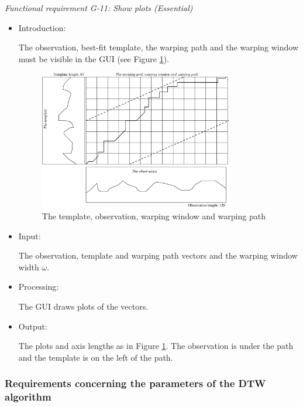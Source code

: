 \documentclass[a4paper,11pt]{article}
\begin{document}
\noindent \emph{Functional requirement G-11: Show plots (Essential)}
\begin{itemize}
\item Introduction:

The observation, best-fit template, the warping path and the warping window must be visible in the GUI 
(see Figure \ref{fig:teobgrid}).
\begin{figure} 
\begin{center} 
\includegraphics[width=0.8\textwidth]{srs_teobgrid.eps}
\caption{The template, observation, warping window and warping path} 
\label{fig:teobgrid}
\end{center} 
\end{figure}

\item Input:

The observation, template and warping path vectors and the warping window width $\omega$.
\item Processing:

The GUI draws plots of the vectors.
\item Output:

The plots and axis lengths as in Figure \ref{fig:teobgrid}. The observation is under the path and the template is on the left of
the path.
\end{itemize}

\subsubsection{Requirements concerning the parameters of the DTW algorithm}
\label{sec:paramreq}
\end{document}
